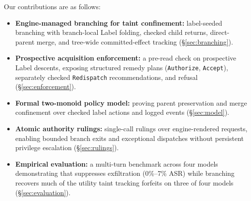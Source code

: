Our contributions are as follows:
\begin{itemize}
  \item \textbf{Engine-managed branching for taint confinement:} label-seeded branching with branch-local Label folding, checked child returns, direct-parent merge, and tree-wide committed-effect tracking (\S\ref{sec:branching}).
  \item \textbf{Prospective acquisition enforcement:} a pre-read check on prospective Label descents, exposing structured remedy plans (\texttt{Authorize}, \texttt{Accept}), separately checked \texttt{Redispatch} recommendations, and refusal (\S\ref{sec:enforcement}).
  \item \textbf{Formal two-monoid policy model:} proving parent preservation and merge confinement over checked label actions and logged events (\S\ref{sec:model}).
  \item \textbf{Atomic authority rulings:} single-call rulings over engine-rendered requests, enabling bounded branch exits and exceptional dispatches without persistent privilege escalation (\S\ref{sec:rulings}).
  \item \textbf{Empirical evaluation:} a multi-turn benchmark across four models demonstrating that \appa{} suppresses exfiltration (0\%--7\% ASR) while branching recovers much of the utility taint tracking forfeits on three of four models (\S\ref{sec:evaluation}).
\end{itemize}
